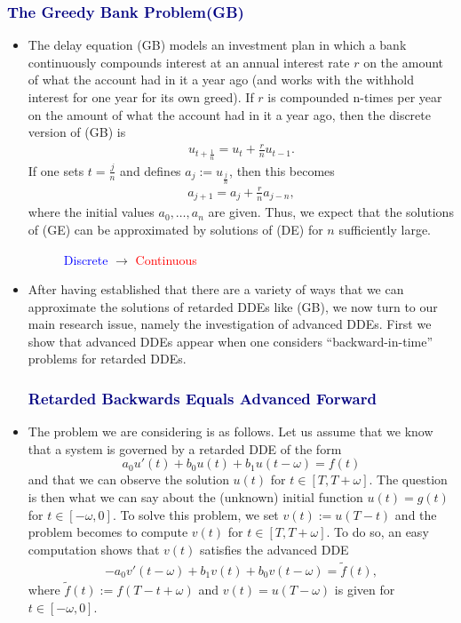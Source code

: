 \documentclass[landscape, a0]{sciposter}
\begin{document}
\begin{multicols}{4}
\subsubsection*{\textcolor{navy}{The Greedy Bank Problem(GB)}}
\begin{itemize}
 \item The delay equation (GB) models an investment plan in which a bank continuously compounds interest at an annual interest rate $r$ on the amount of what the account had in it a year ago (and works with the withhold interest for one year for its own greed). If $r$ is compounded n-times per year on the amount of what the account had in it a year ago, then the discrete version of (GB) is
 \begin{align*}
 u_{t+\frac{1}{n}}=u_{t}+\frac{r}{n}u_{t-1}\mbox{.} 
 \end{align*}
If one sets $t=\frac{j}{n}$ and defines $a_j := u_{\frac{j}{n}}$, then this becomes
 \begin{align} 
  a_{j+1} = a_j + \frac{r}{n}a_{j-n}, \tag{DE}
 \end{align}
 where the initial values $a_0,\dots, a_n$ are given. Thus, we expect that the solutions of (GE) can be approximated by solutions of (DE) for $n$ sufficiently large. 
  \begin{figure}[H]
        \begin{center}
        {\small\caption{{\textcolor{blue}{Discrete}} $\rightarrow$ {\textcolor{red}{Continuous}}}}
        \end{center}
    \end{figure}
  \item After having established that there are a variety of ways that we can approximate the solutions of retarded DDEs like (GB), we now turn to our main research issue, namely the investigation of advanced DDEs. First we show that advanced DDEs appear when one considers ``backward-in-time'' problems for retarded DDEs. 
  
 \subsubsection*{\textcolor{navy}{Retarded Backwards Equals Advanced Forward}}
 \item 
 The problem we are considering is as follows. Let us assume that we know that a system is governed by a retarded DDE of the form $$a_{0}u'(t)+b_{0}u(t)+b_{1}u(t-\omega)= f(t)$$ and that we can observe the solution $u(t)$ for $t\in [T, T+\omega]$. The question is then what we can say about the (unknown) initial function $u(t)=g(t)$ for $t\in [-\omega,0]$. To solve this problem, we set $v(t):=u(T-t)$ and the problem becomes to compute $v(t)$ for $t\in [T, T+\omega]$. To do so, an easy computation shows that $v(t)$ satisfies the advanced DDE 
\begin{align}
-a_{0}v'(t-\omega)+b_{1}v(t)+b_{0}v(t-\omega) = \tilde{f}(t), \tag{**}
\end{align} where $\tilde{f}(t) := f(T-t+\omega)$ and $v(t)=u(T-\omega)$ is given for $t\in[-\omega,0]$.
 \end{itemize}
%

\end{multicols}
\end{document}
